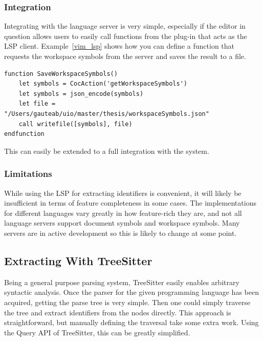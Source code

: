 \documentclass[../thesis.tex]{subfiles}
\begin{document}
\subsubsection{Integration}%
Integrating with the language server is very simple, especially if the editor in question allows users to easily
call functions from the plug-in that acts as the LSP client.
Example~\ref{vim_lsp} shows how you can define a function that requests the workspace symbols from the server and saves the result
to a file.
\begin{example}\label{vim_lsp}
\begin{verbatim}
function SaveWorkspaceSymbols()
    let symbols = CocAction('getWorkspaceSymbols')
    let symbols = json_encode(symbols)
    let file = "/Users/gauteab/uio/master/thesis/workspaceSymbols.json"
    call writefile([symbols], file)
endfunction
\end{verbatim}
\end{example}
This can easily be extended to a full integration with the system.

\subsubsection{Limitations}
While using the LSP for extracting identifiers is convenient, it will likely be insufficient in terms of feature completeness in some cases.
The implementations for different languages vary greatly in how feature-rich they are, and not all language servers support document symbols and workspace symbols.
Many servers are in active development so this is likely to change at some point.


\subsection{Extracting With TreeSitter}
Being a general purpose parsing system, TreeSitter easily enables arbitrary syntactic analysis.
Once the parser for the given programming language has been acquired, getting the parse tree
is very simple.
Then one could simply traverse the tree and extract identifiers from the nodes directly.
This approach is straightforward, but manually defining the traversal take some extra work.
Using the Query API of TreeSitter, this can be greatly simplified.
\end{document}
